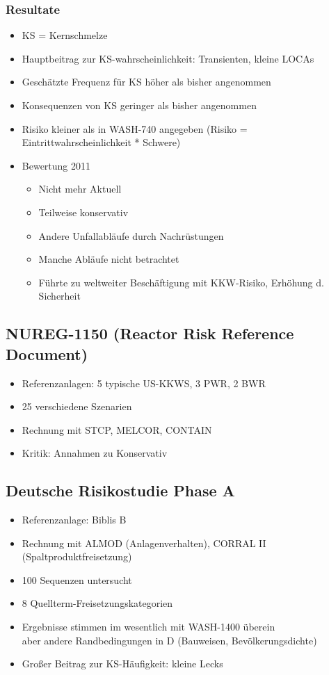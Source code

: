 \documentclass[12pt]{article}
\begin{document}
\subsubsection{Resultate}
\begin{itemize}
	\item KS = Kernschmelze
	\item Hauptbeitrag zur KS-wahrscheinlichkeit: Transienten, kleine LOCAs
	\item Geschätzte Frequenz für KS höher als bisher angenommen
	\item Konsequenzen von KS geringer als bisher angenommen
	\item Risiko kleiner als in WASH-740 angegeben (Risiko = Eintrittwahrscheinlichkeit * Schwere)
	\item Bewertung 2011
		\begin{itemize}
			\item Nicht mehr Aktuell
			\item Teilweise konservativ
			\item Andere Unfallabläufe durch Nachrüstungen
			\item Manche Abläufe nicht betrachtet
			\item Führte zu weltweiter Beschäftigung mit KKW-Risiko, Erhöhung d. Sicherheit
		\end{itemize}
\end{itemize}

\subsection{NUREG-1150 (Reactor Risk Reference Document)}
\begin{itemize}
	\item Referenzanlagen: 5 typische US-KKWS, 3 PWR, 2 BWR
	\item 25 verschiedene Szenarien
	\item Rechnung mit STCP, MELCOR, CONTAIN
	\item Kritik: Annahmen zu Konservativ
\end{itemize}

\subsection{Deutsche Risikostudie Phase A}
\begin{itemize}
	\item Referenzanlage: Biblis B
	\item Rechnung mit ALMOD (Anlagenverhalten), CORRAL II (Spaltproduktfreisetzung)
	\item 100 Sequenzen untersucht
	\item 8 Quellterm-Freisetzungskategorien
	\item Ergebnisse stimmen im wesentlich mit WASH-1400 überein\\
		aber andere Randbedingungen in D (Bauweisen, Bevölkerungsdichte)
	\item Großer Beitrag zur KS-Häufigkeit: kleine Lecks
\end{itemize}
\end{document}
